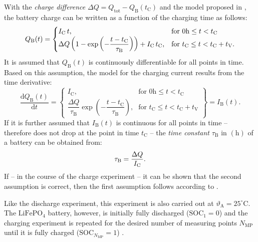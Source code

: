 With the \emph{charge difference} $\Delta Q = Q_\mathrm{tot} - Q_\mathrm{B}(t_\mathrm{C})$ and the model proposed in \cite{Liu:2020}, the battery charge can be written as a function of the charging time as follows: 
\begin{equation} \label{eq:battery_charge_cases}
\centering
		Q_\mathrm{B}(t) =
  		\begin{cases}
   			I_\mathrm{C} \, t \text{,} & \text{for } 0\mathrm{h} \leq t < t_\mathrm{C} 
			\\
    		\Delta Q \left( 1 - \exp \left( -\dfrac{t - t_\mathrm{C}}{\tau_\mathrm{B}} \right) \right) + I_\mathrm{C} \, t_\mathrm{C}\text{,} & \text{for } t_\mathrm{C} \leq t < t_\mathrm{C} + t_\mathrm{V} \text{.}
  		\end{cases}
\end{equation}
It is assumed that $Q_\mathrm{B}(t)$ is continuously differentiable for all points in time. Based on this assumption, the model for the charging current results from the time derivative: 
\begin{equation} \label{current_cases}
\dfrac{\mathrm{d}Q_\mathrm{B}(t)}{\mathrm{d}t} = 
	\left\{\begin{array}{ll}
		I_\mathrm{C}\text{,} & \text{for } 0\mathrm{h} \leq t < t_\mathrm{C} \\[8pt]
		\dfrac{\Delta Q}{\tau_\mathrm{B}} \exp \left( -\dfrac{t - t_\mathrm{C}}{\tau_\mathrm{B}} \right)\text{,} & \text{for } t_\mathrm{C} \leq t < t_\mathrm{C} + t_\mathrm{V}
 	\end{array}\right\} = I_\mathrm{B}(t) \text{.}
\end{equation}
If it is further assumed that $I_\mathrm{B}(t)$ is continuous for all points in time -- therefore does not drop at the point in time $t_\mathrm{C}$ -- the \emph{time constant} $\tau_\mathrm{B}$ in $\left(\mathrm{h}\right)$ of a battery can be obtained from:
\begin{equation}\label{eq:tau_battery}
	\centering
	\tau_\mathrm{B} = \dfrac{\Delta Q}{I_\mathrm{C}}\text{.}
\end{equation}
If -- in the course of the charge experiment -- it can be shown that the second assumption is correct, then the first assumption follows according to \cite{Taschner:2014}.
	
Like the discharge experiment, this experiment is also carried out at $\vartheta_\mathrm{A} = 25^\circ \mathrm{C}$. The $\mathrm{LiFePO}_4$ battery, however, is initially fully discharged ($\mathrm{SOC}_{1} = 0$) and the charging experiment is repeated for the desired number of measuring points $N_{\mathrm{MP}}$ until it is fully charged ($\mathrm{SOC}_{N_\mathrm{MP}} = 1$) \cite{Rahmoun:2012, Hentunen:2014, Gurjer:2019}.

